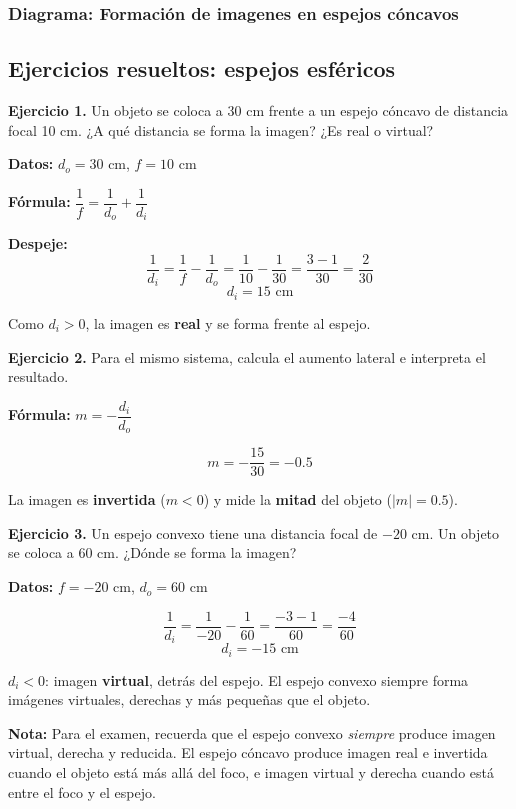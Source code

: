 \subsubsection{Diagrama: Formación de imagenes en espejos cóncavos}

\subsection{Ejercicios resueltos: espejos esféricos}

\begin{seccion}

\textbf{Ejercicio 1.} Un objeto se coloca a 30 cm frente a un espejo cóncavo de distancia focal 10 cm. ¿A qué distancia se forma la imagen? ¿Es real o virtual?

\begin{ecuacion}
\textbf{Datos:} $d_o = 30$ cm, $f = 10$ cm

\textbf{Fórmula:} $\dfrac{1}{f} = \dfrac{1}{d_o} + \dfrac{1}{d_i}$

\textbf{Despeje:}
$$\frac{1}{d_i} = \frac{1}{f} - \frac{1}{d_o} = \frac{1}{10} - \frac{1}{30} = \frac{3-1}{30} = \frac{2}{30}$$
$$d_i = 15 \text{ cm}$$

Como $d_i > 0$, la imagen es \textbf{real} y se forma frente al espejo.
\end{ecuacion}

\vspace{0.4cm}

\textbf{Ejercicio 2.} Para el mismo sistema, calcula el aumento lateral e interpreta el resultado.

\begin{ecuacion}
\textbf{Fórmula:} $m = -\dfrac{d_i}{d_o}$

$$m = -\frac{15}{30} = -0.5$$

La imagen es \textbf{invertida} ($m < 0$) y mide la \textbf{mitad} del objeto ($|m| = 0.5$).
\end{ecuacion}

\vspace{0.4cm}

\textbf{Ejercicio 3.} Un espejo convexo tiene una distancia focal de $-20$ cm. Un objeto se coloca a 60 cm. ¿Dónde se forma la imagen?

\begin{ecuacion}
\textbf{Datos:} $f = -20$ cm, $d_o = 60$ cm

$$\frac{1}{d_i} = \frac{1}{-20} - \frac{1}{60} = \frac{-3-1}{60} = \frac{-4}{60}$$
$$d_i = -15 \text{ cm}$$

$d_i < 0$: imagen \textbf{virtual}, detrás del espejo. El espejo convexo siempre forma imágenes virtuales, derechas y más pequeñas que el objeto.
\end{ecuacion}

\begin{nota}
\textbf{Nota:} Para el examen, recuerda que el espejo convexo \textit{siempre} produce imagen virtual, derecha y reducida. El espejo cóncavo produce imagen real e invertida cuando el objeto está más allá del foco, e imagen virtual y derecha cuando está entre el foco y el espejo.
\end{nota}

\end{seccion}

